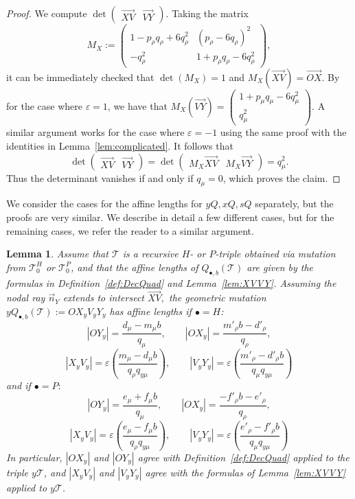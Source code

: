 \documentclass[11pt, reqno]{amsart}
\newtheorem{lemma}[thm]{Lemma}
\theoremstyle{remark}
\numberwithin{equation}{subsection}
\numberwithin{figure}{section}
\theoremstyle{customremark}
\newcommand{\vn}{{\vec{n}}}
\newcommand{\ovr}{\overrightarrow}
\newcommand{\eps}{\varepsilon}
\begin{document}
\begin{proof}
We compute $\det\begin{pmatrix}
    \ovr{XV} & \ovr{VY}
\end{pmatrix}.$
        Taking the matrix 
        \[M_X:=\begin{pmatrix}
        1-p_\rho q_\rho+6q_\rho^2 & (p_\rho-6q_\rho)^2 \\ -q_\rho^2 & 1+p_\rho q_\rho-6q_\rho^2 \end{pmatrix},\]
        it can be immediately checked that $\det(M_X)=1$ and $M_X(\ovr{XV})=\ovr{OX}.$ By \cite[Lemma 6.5]{M1} for the case where $\eps=1$, we have that $M_X(\ovr{VY})=\begin{pmatrix} 1+p_\mu q_\mu-6q_\mu^2 \\ q_\mu^2 \end{pmatrix}.$ A similar argument works for the case where $\eps=-1$ using the same proof with the identities in Lemma~\ref{lem:complicated}.  It follows that
    \[ \det\begin{pmatrix}
    \ovr{XV} & \ovr{VY}
\end{pmatrix}=\det\begin{pmatrix} M_X\ovr{XV} & M_X\ovr{VY} \end{pmatrix}=q_\mu^2.\]
Thus the determinant vanishes if and only if $q_\mu=0$, which proves the claim.
\end{proof}



We consider the cases for the affine lengths for $yQ,xQ,sQ$ separately, but the proofs are very similar. We describe in detail a few different cases, but for the remaining cases, we refer the reader to a similar argument. 

\begin{lemma}\label{lem:yLengths}
Assume that $\mathcal{T}$ is a recursive $H$- or $P$-triple obtained via mutation from $\mathcal{T}_0^H$ or $\mathcal{T}_0^P$, and that the affine lengths of $Q_{\bullet,b}(\mathcal{T})$ are given by the formulas in Definition~\ref{def:DecQuad} and Lemma~\ref{lem:XVVY}. Assuming the nodal ray $\vn_Y$ extends to intersect $\ovr{XV},$ the  geometric mutation $yQ_{\bullet,b}(\mathcal{T}) := OX_yV_yY_y$ has affine lengths if $\bullet=H$:
\[
|OY_y| = \frac{d_\mu - m_\mu b}{q_\mu}, \qquad |OX_y| = \frac{m'_\rho b - d'_\rho}{q_\rho},
\]
\[
|X_yV_y| = \varepsilon\left(\frac{m_\mu - d_\mu b}{q_\rho q_{y\mu}}\right), \qquad |V_yY_y| = \varepsilon\left(\frac{m'_\rho - d'_\rho b}{q_\mu q_{y\mu}}\right)
\]
and if $\bullet=P:$
\[
|OY_y| = \frac{e_\mu + f_\mu b}{q_\mu}, \qquad |OX_y| = \frac{-f'_\rho b - e'_\rho}{q_\rho},
\]
\[
|X_yV_y| = \varepsilon\left(\frac{e_\mu - f_\mu b}{q_\rho q_{y\mu}}\right), \qquad |V_yY_y| = \varepsilon\left(\frac{e'_\rho - f'_\rho b}{q_\mu q_{y\mu}}\right)
\]
In particular, $|OX_y|$ and $|OY_y|$ agree with Definition~\ref{def:DecQuad} applied to the triple $y\mathcal{T}$, and $|X_yV_y|$ and $|V_yY_y|$ agree with the formulas of Lemma~\ref{lem:XVVY} applied to $y\mathcal{T}$.
\end{lemma}
\end{document}
